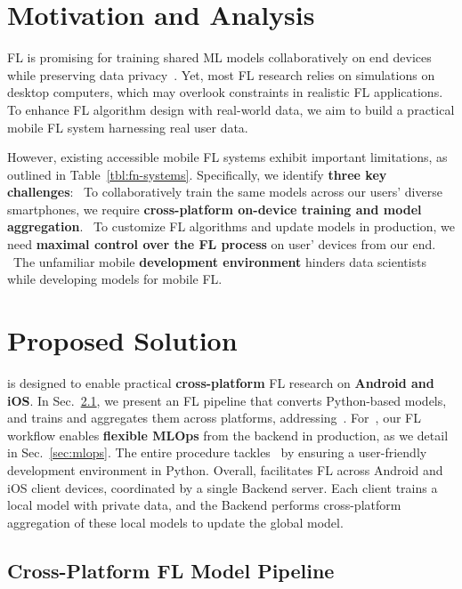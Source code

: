 \documentclass[conference]{IEEEtran}
\begin{document}

\section{Motivation and Analysis}

FL is promising for training shared ML models collaboratively on
end devices while preserving data privacy~\cite{farcas2023demo}.
Yet, most FL research relies on simulations on desktop computers,
which may overlook constraints in realistic FL applications.
To enhance FL algorithm design with real-world data,
we aim to build a practical mobile FL system
harnessing real user data.

However,
existing accessible mobile FL systems exhibit important limitations,
as outlined in Table~\ref{tbl:fn-systems}.
Specifically, we identify \textbf{three key challenges}:
\challa~To collaboratively train the same models across
our users' diverse smartphones,
we require \textbf{cross-platform on-device training and model aggregation}.
\challb~To customize FL algorithms and update models in production,
we need \textbf{maximal control over the FL process} on
user' devices from our end.
\challc~The unfamiliar mobile \textbf{development environment} hinders
data scientists while developing models for mobile FL.

\section{Proposed Solution}

\FedKit{} is designed to enable practical \textbf{cross-platform} FL research on
\textbf{Android and iOS}.
In Sec.~\ref{sec:pipeline},
we present an FL pipeline that converts Python-based models,
and trains and aggregates them across platforms,
addressing~\challa{}.
For~\challb{},
our FL workflow enables \textbf{flexible MLOps} from the backend in production,
as we detail in Sec.~\ref{sec:mlops}.
The entire procedure tackles~\challc{} by
ensuring a user-friendly development environment in Python.
Overall,
\FedKit{} facilitates FL across Android and iOS client devices,
coordinated by a single Backend server.
Each client trains a local model with private data,
and the Backend performs cross-platform aggregation of these local models to update the global model.

\subsection{Cross-Platform FL Model Pipeline}
\label{sec:pipeline}
\end{document}
